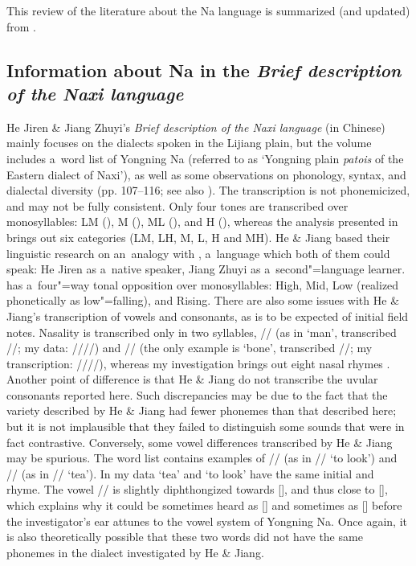 This review of the literature about the Na language is summarized (and updated) from \citet[14-21]{michaud2017}. 

\subsection{Information about Na in the \textit{Brief description of the Naxi language}}

He Jiren \& Jiang Zhuyi’s \citeyear{heetal1985} \textit{Brief description of the Naxi language} (in Chinese) mainly focuses on the dialects spoken in the Lijiang plain, but the volume includes a~word list of Yongning Na (referred to as ‘Yongning plain \textit{patois} of the Eastern dialect of Naxi'), as well as some observations on phonology,
syntax, and dialectal diversity (pp. 107--116; see also \citealt{jiang1993}). The transcription is not phonemicized, and may not be fully consistent. Only four tones are
transcribed over monosyllables: LM (), M (), ML (), and H (), whereas
the analysis presented in \citet[53-92]{michaud2017} brings out six categories (LM, LH, M, L, H and MH). He \& Jiang based their linguistic research on
an~{analogy} with , a~language which both of them could speak: He Jiren as a~native speaker, Jiang
Zhuyi as a~second"=language learner.  has a~four"=way tonal opposition over monosyllables:
High, Mid, Low (realized phonetically as low"=falling),
and Rising.  
There are also some issues with He \& Jiang’s transcription of vowels and consonants, as is to be
expected of initial field notes. Nasality is transcribed only in two syllables, // (as in
‘man’, transcribed //; my data: ////) and // (the only example is ‘bone’,
transcribed //; my transcription: ////), whereas my investigation brings out eight nasal rhymes \citep[461-464]{michaud2017}. Another point of difference is that He \&
Jiang do not transcribe the uvular consonants reported here. Such
discrepancies may be due to the fact that the variety described by He \& Jiang had fewer phonemes
than that described here; but it is not implausible that they failed to distinguish some sounds that
were in fact contrastive. Conversely, some vowel differences transcribed by He \& Jiang may be spurious. The word list
contains examples of // (as in // ‘to look’) and // (as in //
‘tea’). In my data ‘tea’ and ‘to look’ have the same initial and rhyme. The vowel // is
slightly diphthongized towards [], and thus close to [], which explains why it could be
sometimes heard as [] and sometimes as [] before the investigator’s ear attunes to the
vowel system of Yongning Na. Once again, it is also theoretically possible that these two words did
not have the same phonemes in the dialect investigated by He \& Jiang.

